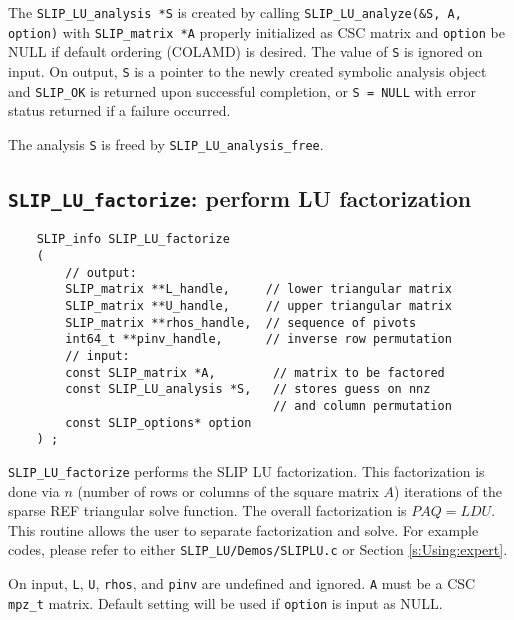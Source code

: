 \documentclass[12pt]{article}
\theoremstyle{definition}
\begin{document}
The \verb|SLIP_LU_analysis *S| is created by calling
\verb|SLIP_LU_analyze(&S, A, option)| with \verb|SLIP_matrix *A| properly
initialized as CSC matrix and \verb|option| be NULL if default ordering
(COLAMD) is desired. The value of \verb|S| is ignored on input.  On output,
\verb|S| is a pointer to the newly created symbolic analysis object and
\verb|SLIP_OK| is returned upon successful completion, or
\verb|S = NULL| with error status returned if a failure occurred.

The analysis \verb|S| is freed by \verb|SLIP_LU_analysis_free|.

\cprotect\subsection{\verb|SLIP_LU_factorize|: perform LU factorization}
\label{ss:SLIP_LU_factorize}

\begin{mdframed}[userdefinedwidth=6in]
{\footnotesize
\begin{verbatim}
    SLIP_info SLIP_LU_factorize
    (
        // output:
        SLIP_matrix **L_handle,     // lower triangular matrix
        SLIP_matrix **U_handle,     // upper triangular matrix
        SLIP_matrix **rhos_handle,  // sequence of pivots
        int64_t **pinv_handle,      // inverse row permutation
        // input:
        const SLIP_matrix *A,        // matrix to be factored
        const SLIP_LU_analysis *S,   // stores guess on nnz
                                     // and column permutation
        const SLIP_options* option
    ) ;
\end{verbatim}
} \end{mdframed}

\verb|SLIP_LU_factorize| performs the SLIP LU factorization. This factorization
is done via $n$ (number of rows or columns of the square matrix $A$) iterations
of the sparse REF triangular solve function. The overall factorization is
$PAQ = LDU$.  This routine allows the user to separate factorization and solve.
For example codes, please refer to either \verb|SLIP_LU/Demos/SLIPLU.c| or
Section \ref{s:Using:expert}.

On input, \verb|L|, \verb|U|, \verb|rhos|, and \verb|pinv| are undefined and
ignored.  \verb|A| must be a CSC \verb|mpz_t| matrix. Default
setting will be used if \verb|option| is input as NULL.
\end{document}
